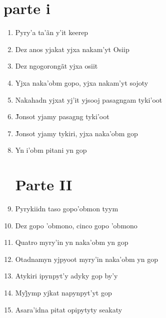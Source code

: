 \section{parte i}

\begin{enumerate}
 \item Pyry'a ta'ãn y'it keerep

 \item Dez anos yjakat yjxa nakam'yt Osiip

 \item Dez ngogorongãt yjxa osiit

 \item Yjxa naka'obm gopo, yjxa nakam'yt sojoty

 \begin{center}\end{center}

 \item Nakahadn yjxat yj'it yjsooj pasagngam tyki'oot

 \item J̃onsot yjamy pasagng tyki’oot

 \item J̃onsot yjamy tykiri, yjxa naka’obm gop

 \item Yn i’obm pitani yn gop

 \section{Parte II}

 \item Pyrykiidn taso gopo'obmon tyym

 \item Dez gopo 'obmono, cinco gopo 'obmono

 \item Quatro myry'in yn naka'obm yn gop

 \item Otadnamyn yjpyoot myry'in naka'obm yn gop

 \begin{center}\end{center}

 \item Atykiri ipynpyt'y adyky gop by'y

 \item Myj̃ymp yjkat napynpyt’yt gop

 \item Asara'idna pitat opipytyty seakaty


\end{enumerate}
